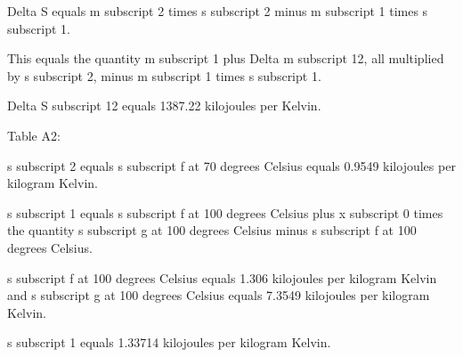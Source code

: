 Delta S equals m subscript 2 times s subscript 2 minus m subscript 1 times s subscript 1.

This equals the quantity m subscript 1 plus Delta m subscript 12, all multiplied by s subscript 2, minus m subscript 1 times s subscript 1.

Delta S subscript 12 equals 1387.22 kilojoules per Kelvin.

Table A2:

s subscript 2 equals s subscript f at 70 degrees Celsius equals 0.9549 kilojoules per kilogram Kelvin.

s subscript 1 equals s subscript f at 100 degrees Celsius plus x subscript 0 times the quantity s subscript g at 100 degrees Celsius minus s subscript f at 100 degrees Celsius.

s subscript f at 100 degrees Celsius equals 1.306 kilojoules per kilogram Kelvin and s subscript g at 100 degrees Celsius equals 7.3549 kilojoules per kilogram Kelvin.

s subscript 1 equals 1.33714 kilojoules per kilogram Kelvin.